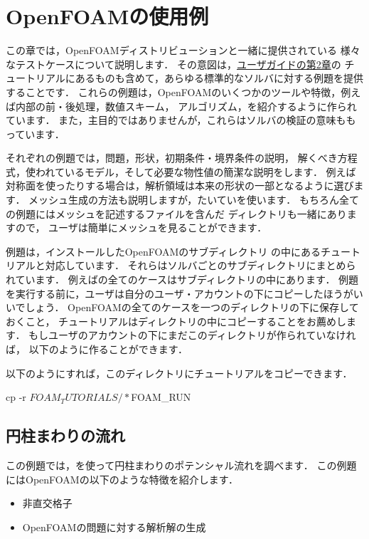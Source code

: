 \chapter{OpenFOAMの使用例}
\label{chap:3}
この章では，OpenFOAMディストリビューションと一緒に提供されている
様々なテストケースについて説明します．
その意図は，\href{UserGuideJa.pdf#chapter.2}{ユーザガイドの第2章}の
チュートリアルにあるものも含めて，あらゆる標準的なソルバに対する例題を提供することです．
これらの例題は，OpenFOAMのいくつかのツールや特徴，例えば内部の前・後処理，数値スキーム，
アルゴリズム，を紹介するように作られています．
また，主目的ではありませんが，これらはソルバの検証の意味ももっています．

それぞれの例題では，問題，形状，初期条件・境界条件の説明，
解くべき方程式，使われているモデル，そして必要な物性値の簡潔な説明をします．
例えば対称面を使ったりする場合は，解析領域は本来の形状の一部となるように選びます．
メッシュ生成の方法も説明しますが，たいていを使います．
もちろん全ての例題にはメッシュを記述するファイルを含んだ
ディレクトリも一緒にありますので，
ユーザは簡単にメッシュを見ることができます．

例題は，インストールしたOpenFOAMのサブディレクトリ
の中にあるチュートリアルと対応しています．
それらはソルバごとのサブディレクトリにまとめられています．
例えばの全てのケースはサブディレクトリの中にあります．
例題を実行する前に，ユーザは自分のユーザ・アカウントの下にコピーしたほうがいいでしょう．
OpenFOAMの全てのケースを一つのディレクトリの下に保存しておくこと，
チュートリアルはディレクトリの中にコピーすることをお薦めします．
もしユーザのアカウントの下にまだこのディレクトリが作られていなければ，
以下のように作ることができます．
以下のようにすれば，このディレクトリにチュートリアルをコピーできます．
\begin{OFverbatim}[terminal]
cp -r $FOAM_TUTORIALS/* $FOAM_RUN
\end{OFverbatim}



\section{円柱まわりの流れ}
\label{sec:3.1}
この例題では，を使って円柱まわりのポテンシャル流れを調べます．
この例題にはOpenFOAMの以下のような特徴を紹介します．
\begin{itemize}
 \item 非直交格子
 \item OpenFOAMの問題に対する解析解の生成
\end{itemize}


